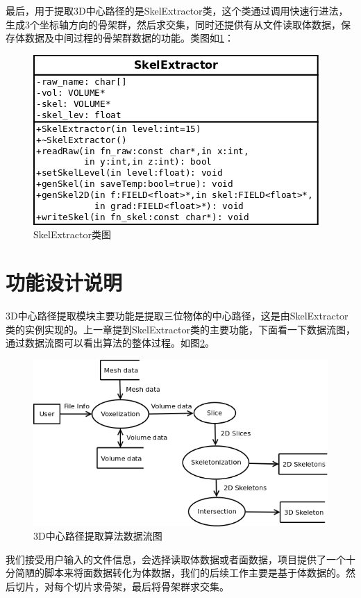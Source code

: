 最后，用于提取3D中心路径的是SkelExtractor类，这个类通过调用快速行进法，生成3个坐标轴方向的骨架群，然后求交集，同时还提供有从文件读取体数据，保存体数据及中间过程的骨架群数据的功能。类图如\ref{skelextractor-class}：
\begin{figure}[h!]
    \centering
    \includegraphics[width=300bp]{figure/skelextractor.png}
    \caption{SkelExtractor类图}
    \label{skelextractor-class}
\end{figure}

\section{功能设计说明}
3D中心路径提取模块主要功能是提取三位物体的中心路径，这是由SkelExtractor类的实例实现的。上一章提到SkelExtractor类的主要功能，下面看一下数据流图，通过数据流图可以看出算法的整体过程。如图\ref{dataflow}。
\begin{figure}[h!]
    \centering
    \includegraphics[width=400bp]{figure/dataflow.png}
    \caption{3D中心路径提取算法数据流图}
    \label{dataflow}
\end{figure}
我们接受用户输入的文件信息，会选择读取体数据或者面数据，项目提供了一个十分简陋的脚本来将面数据转化为体数据，我们的后续工作主要是基于体数据的。然后切片，对每个切片求骨架，最后将骨架群求交集。

